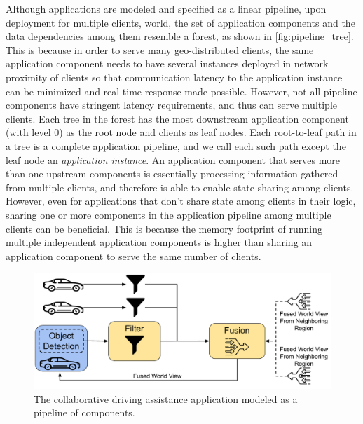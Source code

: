 Although applications are modeled and specified as a linear pipeline, upon deployment for multiple clients, world, the set of application components and the data dependencies among them resemble a forest, as shown in \cref{fig:pipeline_tree}. This is because in order to serve many geo-distributed clients, the same application component needs to have several instances deployed in network proximity of clients so that communication latency to the application instance can be minimized and real-time response made possible. However, not all pipeline components have stringent latency requirements, and thus can serve multiple clients. Each tree in the forest has the most downstream application component (with level 0) as the root node and clients as leaf nodes. Each root-to-leaf path in a tree is a complete application pipeline, and we call each such path except the leaf node an \textit{application instance}. An application component that serves more than one upstream components is essentially processing information gathered from multiple clients, and therefore is able to enable state sharing among clients. However, even for applications that don't share state among clients in their logic, sharing one or more components in the application pipeline among multiple clients can be beneficial. This is because the memory footprint of running multiple independent application components is higher than sharing an application component to serve the same number of clients.

\begin{figure}[ht]
\centering
\includegraphics[width=0.8\columnwidth]{figures/oneedge/collaborative_driving_app.pdf}
\caption{The collaborative driving assistance application modeled as a pipeline of components.}
\label{fig:collab_driving_pipeline}
\end{figure}

